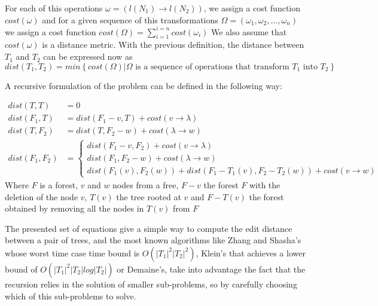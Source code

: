 For each of this operations $\omega = (l(N_1) \rightarrow l(N_2))$, we assign a cost function $cost(\omega)$ and for a given sequence of this transformations $\Omega = (\omega_1, \omega_2, ... , \omega_n)$ we assign a cost function $cost(\Omega) = \sum_{i=1}^{i=n} {cost(\omega_i)}$ 
We also assume that $cost(\omega)$ is a distance metric. 
With the previous definition, the distance between $T_1$ and $T_2$ can be expressed now as $ dist(T_1, T_2) = min\left\{ cost(\Omega)| \Omega \text{ is a sequence of operations that transform } T_1 \text{ into } T_2 \right\} $

A recursive formulation of the problem can be defined in the following way:

\begin{align*}
dist(T,T) &= 0 \\
dist(F_1, T) &= dist(F_1 - v, T) + cost(v \rightarrow \lambda) \\
dist(T, F_2) &= dist(T, F_2 - w) + cost(\lambda \rightarrow w) \\
dist(F_1, F_2)&=\left\{
\begin{array}{ll}
dist(F_1 - v, F_2) + cost(v \rightarrow \lambda) \\
dist(F_1, F_2 - w) + cost(\lambda \rightarrow w) \\
dist(F_1(v), F_2(w)) + dist(F_1 - T_1(v), F_2 - T_2(w)) + cost(v \rightarrow w)
\end{array}
\right.
\end{align*}  
Where $F$ is a forest, $v$ and $w$ nodes from a free, $F - v$ the forest $F$ with the deletion of the node $v$, $T(v)$  the tree rooted at $v$ and $F-T(v)$ the forest obtained by removing all the nodes in $T(v)$ from $F$	

The presented set of equations give a simple way to compute the edit distance between a pair of trees, and the most known algorithms like Zhang and Shasha's\cite{zhang_shasha} whose worst time case time bound is $O(|T_1|^2|T_2|^2)$, Klein's\cite{klein} that achieves a lower bound of $O(|T_1|^2|T_2|log|T_2|)$ or Demaine's\cite{demaine}, take into advantage the fact that the recursion relies in the solution of smaller sub-problems, so by carefully choosing which of this sub-problems to solve.


\thispagestyle{empty}



